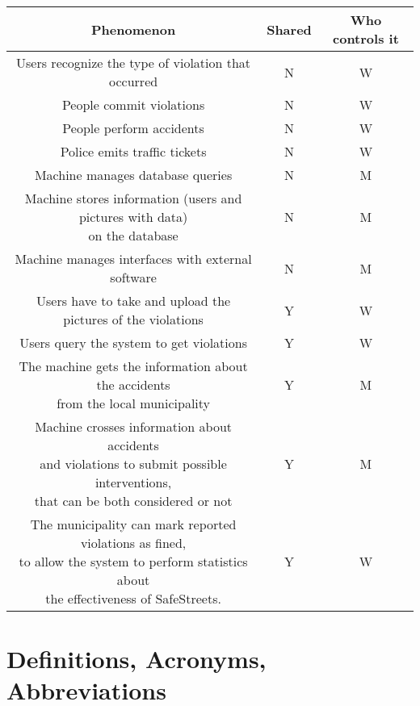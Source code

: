 \documentclass[../RASD.tex]{subfiles}
\begin{document}
        \newpage
        \begin{center}
            \begin{tabular}{ ||c|c|c|| }

                \hline
                \textbf{Phenomenon} & \textbf{Shared} & \textbf{Who controls it} \\ \hline
                Users recognize the type of violation that occurred & N & W \\ \hline
                People commit violations & N & W\\ \hline
                People perform accidents & N & W\\ \hline
                Police emits traffic tickets & N & W\\ \hline
                Machine manages database queries & N & M\\ \hline
                \makecell{Machine stores information (users and pictures with data)
                \\ on the database} & N & M\\ \hline
                Machine manages interfaces with external software & N & M\\ \hline
                Users have to take and upload the pictures of the violations & Y & W\\ \hline
                Users query the system to get violations & Y & W\\ \hline
                \makecell{The machine gets the information about the accidents
                \\from the local municipality} & Y & M\\ \hline
                \makecell{Machine crosses information about accidents
                \\and violations to submit possible interventions,
                \\that can be both considered or not} & Y & M\\ \hline
                \makecell{The municipality can mark reported violations as fined, \\ to allow the system
                to perform statistics about \\ the effectiveness of SafeStreets.} & Y & W\\

                \hline
            \end{tabular}
        \end{center}
    \newpage
    \section{Definitions, Acronyms, Abbreviations}\label{sec:definitions,-acronyms,-abbreviations}
\end{document}
